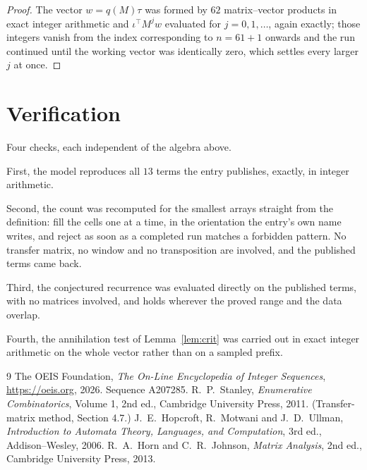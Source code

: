\documentclass[11pt,a4paper]{article}
\theoremstyle{plain}
\theoremstyle{definition}
\begin{document}
\begin{proof}
The vector $w=q(M)\tau$ was formed by $62$ matrix--vector products in exact integer
arithmetic and $\iota^{\!\top}M^{j}w$ evaluated for $j=0,1,\dots$, again exactly; those
integers vanish from the index corresponding to $n=61+1$ onwards and the run continued
until the working vector was identically zero, which settles every larger $j$ at once.
\end{proof}

\section{Verification}

Four checks, each independent of the algebra above.

First, the model reproduces all $13$ terms the entry publishes, exactly, in integer
arithmetic.

Second, the count was recomputed for the smallest arrays straight from the definition: fill the
cells one at a time, in the orientation the entry's own name writes, and reject as soon as a
completed run matches a forbidden pattern. No transfer matrix, no window and no transposition
are involved, and the published terms came back.

Third, the conjectured recurrence was evaluated directly on the published terms, with no
matrices involved, and holds wherever the proved range and the data overlap.

Fourth, the annihilation test of Lemma~\ref{lem:crit} was carried out in exact integer
arithmetic on the whole vector rather than on a sampled prefix.

\begin{thebibliography}{9}
 The OEIS Foundation, \emph{The On-Line Encyclopedia of Integer
Sequences}, \url{https://oeis.org}, 2026. Sequence A207285.
 R.~P.~Stanley, \emph{Enumerative Combinatorics}, Volume 1, 2nd ed.,
Cambridge University Press, 2011. (Transfer-matrix method, Section 4.7.)
 J.~E.~Hopcroft, R.~Motwani and J.~D.~Ullman, \emph{Introduction to Automata
Theory, Languages, and Computation}, 3rd ed., Addison--Wesley, 2006.
 R.~A.~Horn and C.~R.~Johnson, \emph{Matrix Analysis}, 2nd ed., Cambridge
University Press, 2013.
\end{thebibliography}
\end{document}
